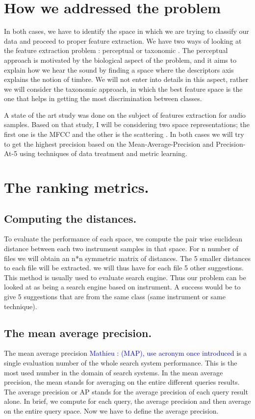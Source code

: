\documentclass[hidelinks,12pt]{report}
\newcommand{\ml}[1]{\textcolor{blue}{ Mathieu : #1}}
\begin{document}
\section{How we addressed the problem}
In both cases, we have to identify the space in which we are trying to classify our data and proceed to proper feature extraction. We have two ways of looking at the feature extraction problem : perceptual or taxonomic \cite{P03}. The perceptual approach is motivated by the biological aspect of the problem, and it aims to explain how we hear the sound by finding a space where the descriptors axis explains the notion of timbre. We will not enter into details in this aspect, rather we will consider the taxonomic approach, in which the best feature space is the one that helps in getting the most discrimination between classes.\par
A state of the art study was done on the subject of features extraction for audio samples. Based on that study, I will be considering two space representations; the first one is the MFCC and the other is the scattering \cite{AM11}. In both cases we will try to get the highest precision based on the Mean-Average-Precision and Precision-At-5 using techniques of data treatment and metric learning. 

\section{The ranking metrics.}
\subsection{Computing the distances.}
To evaluate the performance of each space, we compute the pair wise euclidean distance between each two instrument samples in that space. For n number of files we will obtain an n*n symmetric matrix of distances. The 5 smaller distances to each file  will be extracted. we will thus have for each file 5 other suggestions. This method is usually used to evaluate search engine. Thus our problem can be looked at as being a search engine based on instrument. A success would be to give 5 suggestions that are from the same class (same instrument or same technique).
\subsection{The mean average precision.}
The mean average precision \ml{(MAP), use acronym once introduced} is a single evaluation number of the whole search system performance. This is the most used number in the domain of search systems. In the mean average precision, the mean stands for averaging on the entire different queries results. The average precision or AP stands for the average precision of each query result alone. In brief, we compute for each query, the average precision and then average on the entire query space. Now we have to define the average precision.
\end{document}
